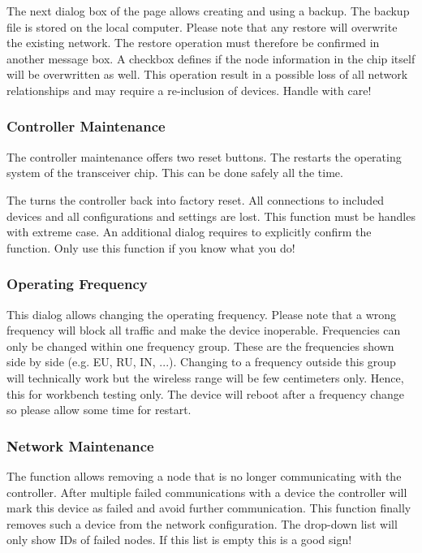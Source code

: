 {The next dialog  box of the page allows creating and using a backup.  The backup file is 
stored on the local computer. Please note that any restore will overwrite the existing 
network. The restore operation must therefore be confirmed in another message box. A 
checkbox defines if the node information in the \zwave chip itself will be overwritten 
as well. This operation result in a possible loss of all network relationships and may 
require a re-inclusion of devices. Handle with care!

\subsubsection{Controller Maintenance}

The controller maintenance offers two reset buttons. The  restarts 
the operating system of the \zwave transceiver chip. This can be done safely all the time.

The  turns the controller back into factory reset. All connections 
to included devices and all configurations and settings are lost. This function must be 
handles with extreme case. An additional dialog requires to explicitly confirm the 
function. Only use this function if you know what you do!

\subsubsection{Operating Frequency}


This dialog allows changing the operating frequency. Please note that a wrong frequency 
will block all \zwave traffic and make the device inoperable.  Frequencies can only be 
changed within one frequency group. These are the frequencies shown side by side (e.g. 
EU, RU, IN, ...). Changing to a frequency outside this group will technically work but 
the wireless range will be few centimeters only. Hence, this for workbench testing only. 
The device will reboot after a frequency change so please allow some time for restart.

\subsubsection{Network Maintenance}

The function  allows removing a node that is no longer communicating 
with the controller. After multiple failed communications with a device the controller 
will mark this device as failed and avoid further communication. This function finally 
removes such a device from the network configuration. The drop-down list will only show 
IDs of failed nodes. If this list is empty this is a good sign!

}
